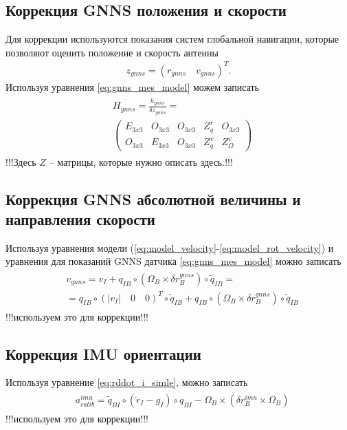 \documentclass[a4paper,12pt]{article}
\begin{document}
\subsection{Коррекция GNNS положения и скорости}
Для коррекции используются показания систем глобальной навигации, которые позволяют оценить положение и скорость антенны
\begin{align}
z_{gnns} = (r_{gnns} \quad v_{gnns})^T.
\end{align}
Используя уравнения \eqref{eq:gnns_mes_model} можем записать 
\begin{align}
\begin{split}
&H_{gnns} = \frac{h_{gnns}}{\delta z_{gnns}} =  \\
&\begin{pmatrix}
E_{3x3} & O_{3x3} & O_{3x3} & Z^r_q & O_{3x3}   \\
O_{3x3} & E_{3x3} & O_{3x3} & Z^v_q & Z^v_{\Omega}
\end{pmatrix}
\end{split}
\end{align}
!!!Здесь $Z$ -- матрицы, которые нужно описать здесь.!!!

\subsection{Коррекция GNNS абсолютной величины и направления скорости}
Используя уравнения модели (\ref{eq:model_velocity}-\ref{eq:model_rot_velocity}) и уравнения для показаний GNNS датчика \eqref{eq:gnns_mes_model} можно записать
\begin{align}
\begin{split}
&v_{gnns} = v_I + q_{IB} \circ  (\Omega_B \times \delta r^{gnns}_B) \circ \tilde{q}_{IB} = \\
& = q_{IB} \circ (|v_I| \quad 0 \quad 0)^T \circ \tilde{q}_{IB} + q_{IB} \circ  (\Omega_B \times \delta r^{gnns}_B) \circ \tilde{q}_{IB}
\end{split}
\end{align}
!!!используем это для коррекции!!!

\subsection{Коррекция IMU ориентации}
Используя уравнение \eqref{eq:rddot_i_simle}, можно записать
\begin{align} 
\begin{split}
&a^{imu}_{calib}  = \tilde{q}_{BI} \circ (\ddot{r}_{I} - g_I) \circ q_{BI} - \Omega_B \times (\delta r^{imu}_B \times \Omega_B) 
\end{split}
\end{align}
!!!используем это для коррекции!!!
\end{document}
